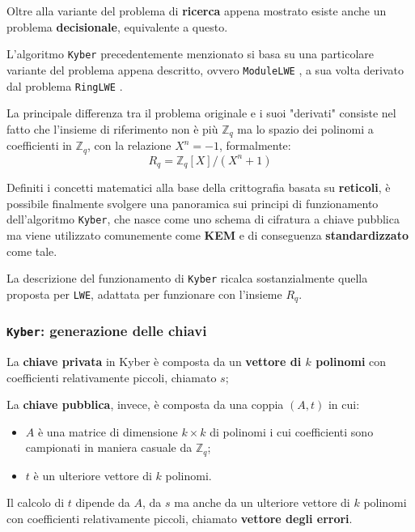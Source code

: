 \documentclass[a4paper, 12pt, oneside]{article}
\theoremstyle{definition}
\begin{document}
Oltre alla variante del problema di \textbf{ricerca} appena mostrato esiste anche un problema \textbf{decisionale}, equivalente a questo.

L'algoritmo \texttt{Kyber} precedentemente menzionato si basa su una particolare variante del problema appena descritto, ovvero \texttt{ModuleLWE} \cite{cryptoeprint:2012/090}, a sua volta derivato dal problema \texttt{RingLWE} \cite{cryptoeprint:2012/230}.

La principale differenza tra il problema originale e i suoi "derivati" consiste nel fatto che l'insieme di riferimento non è più $\mathbb{Z}_q$ ma lo spazio dei polinomi a coefficienti in $\mathbb{Z}_q$, con la relazione $ X^n = - 1 $, formalmente: \[ R_q = \mathbb{Z}_q [X] / (X^n + 1)\]

Definiti i concetti matematici alla base della crittografia basata su \textbf{reticoli}, è possibile finalmente svolgere una panoramica sui principi di funzionamento dell'algoritmo \texttt{Kyber}, che nasce come uno schema di cifratura a chiave pubblica ma viene utilizzato comunemente come \textbf{KEM} e di conseguenza \textbf{standardizzato} come tale.

La descrizione del funzionamento di \texttt{Kyber} \cite{kyber-definition} ricalca sostanzialmente quella proposta per \texttt{LWE}, adattata per funzionare con l'insieme $R_q$.

\subsubsection{\texttt{Kyber}: generazione delle chiavi}

La \textbf{chiave privata} in Kyber è composta da un \textbf{vettore di $k$ polinomi} con coefficienti relativamente piccoli, chiamato $s$;

La \textbf{chiave pubblica}, invece, è composta da una coppia $(A, t)$ in cui:

\begin{itemize}
    \item $A$ è una matrice di dimensione $k \times k$ di polinomi i cui coefficienti sono campionati in maniera casuale da $\mathbb{Z}_q$;
    \item $t$ è un ulteriore vettore di $k$ polinomi.
\end{itemize}

Il calcolo di $t$ dipende da $A$, da $s$ ma anche da un ulteriore vettore di $k$ polinomi con coefficienti relativamente piccoli, chiamato \textbf{vettore degli errori}.
\end{document}
